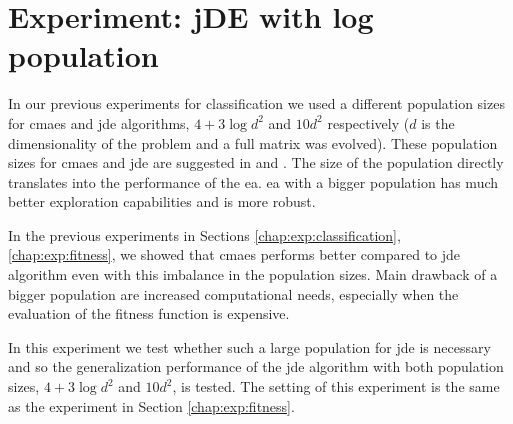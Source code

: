 \documentclass[12pt,a4paper]{report}
\begin{document}

\section{Experiment: jDE with log population} \label{chap:exp:logjde}
In our previous experiments for classification we used a different population sizes for \ac{cmaes} and \ac{jde} algorithms, $4+3\log{d^2}$ and $10d^2$ respectively ($d$ is the dimensionality of the problem and a full matrix was evolved). These population sizes for \ac{cmaes} and \ac{jde} are suggested in \cite{hansen2001completely} and \cite{brest2006self}. The size of the population directly translates into the performance of the \acl{ea}. \ac{ea} with a bigger population has much better exploration capabilities and is more robust.

In the previous experiments in Sections \ref{chap:exp:classification}, \ref{chap:exp:fitness}, we showed that \ac{cmaes} performs better compared to \ac{jde} algorithm \cite{fukui2013evolutionary} even with this imbalance in the population sizes. Main drawback of a bigger population are increased computational needs, especially when the evaluation of the fitness function is expensive.

In this experiment we test whether such a large population for \ac{jde} is necessary and so the generalization performance of the \ac{jde} algorithm with both population sizes, $4+3\log{d^2}$ and $10d^2$, is tested. The setting of this experiment is the same as the experiment in Section \ref{chap:exp:fitness}.
\end{document}
